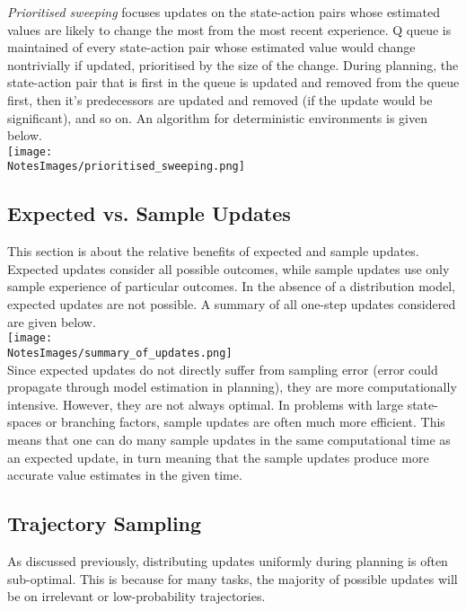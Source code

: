 \emph{Prioritised sweeping} focuses updates on the state-action pairs whose estimated values are likely to change the most from the most recent experience. Q queue is maintained of every state-action pair whose estimated value would change nontrivially if updated, prioritised by the size of the change. During planning, the state-action pair that is first in the queue is updated and removed from the queue first, then it's predecessors are updated and removed (if the update would be significant), and so on. An algorithm for deterministic environments is given below.\\

\texttt{[image: \\NotesImages/prioritised\_sweeping.png]}\\

\subsection{Expected vs. Sample Updates}
This section is about the relative benefits of expected and sample updates. Expected updates consider all possible outcomes, while sample updates use only sample experience of particular outcomes. In the absence of a distribution model, expected updates are not possible. A summary of all one-step updates considered are given below.\\

\texttt{[image: \\NotesImages/summary\_of\_updates.png]}\\

Since expected updates do not directly suffer from sampling error (error could propagate through model estimation in planning), they are more computationally intensive. However, they are not always optimal. In problems with large state-spaces or branching factors, sample updates are often much more efficient. This means that one can do many sample updates in the same computational time as an expected update, in turn meaning that the sample updates produce more accurate value estimates in the given time.

\subsection{Trajectory Sampling}
As discussed previously, distributing updates uniformly during planning is often sub-optimal. This is because for many tasks, the majority of possible updates will be on irrelevant or low-probability trajectories.\\

